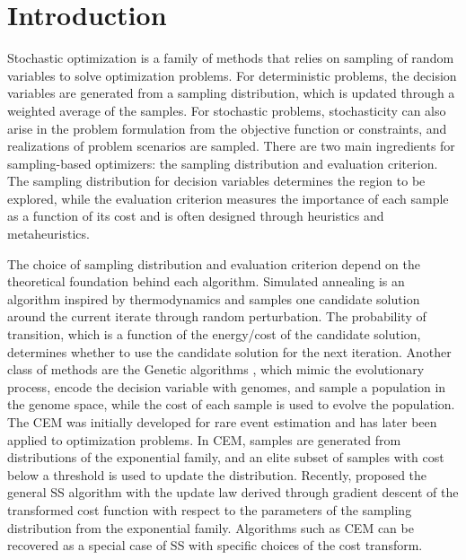 \documentclass[twoside,11pt]{article}
\begin{document}


\section{Introduction}
\label{sec: introduction}

Stochastic optimization is a family of methods that relies on sampling of random variables to solve optimization problems. For deterministic problems, the decision variables are generated from a sampling distribution, which is updated through a weighted average of the samples. For stochastic problems, stochasticity can also arise in the problem formulation from the objective function or constraints, and realizations of problem scenarios are sampled. There are two main ingredients for sampling-based optimizers: the sampling distribution and evaluation criterion. The sampling distribution for decision variables determines the region to be explored, while the evaluation criterion measures the importance of each sample as a function of its cost and is often designed through heuristics and metaheuristics. 

The choice of sampling distribution and evaluation criterion depend on the theoretical foundation behind each algorithm. Simulated annealing \citep{kirkpatrick1983optimization} is an algorithm inspired by thermodynamics and samples one candidate solution around the current iterate through random perturbation. The probability of transition, which is a function of the energy/cost of the candidate solution, determines whether to use the candidate solution for the next iteration. Another class of methods are the Genetic algorithms \cite{mitchell1998introduction}, which mimic the evolutionary process, encode the decision variable with genomes, and sample a population in the genome space, while the cost of each sample is used to evolve the population. The \ac{CEM} was initially developed for rare event estimation and has later been applied to optimization problems. In \ac{CEM}, samples are generated from distributions of the exponential family, and an elite subset of samples with cost below a threshold is used to update the distribution. Recently, \cite{zhou2014gradient} proposed the general \ac{SS} algorithm with the update law derived through gradient descent of the transformed cost function with respect to the parameters of the sampling distribution from the exponential family. Algorithms such as \ac{CEM} can be recovered as a special case of \ac{SS} with specific choices of the cost transform.
\end{document}

